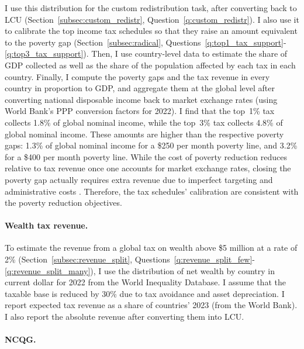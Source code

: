 I use this distribution for the custom redistribution task, after converting back to LCU (Section~\ref{subsec:custom_redistr}, Question~\ref{q:custom_redistr}). I also use it to calibrate the top income tax schedules so that they raise an amount equivalent to the poverty gap (Section~\ref{subsec:radical}, Questions~\ref{q:top1_tax_support}-\ref{q:top3_tax_support}). %
Then, I use country-level data to estimate the share of GDP collected as well as the share of the population affected by each tax in each country. 
Finally, I compute the poverty gaps and the tax revenue in every country in proportion to GDP, and aggregate them at the global level after converting national disposable income back to market exchange rates (using World Bank's PPP conversion factors for 2022). 
I find that the top~1\% tax collects 1.8\% of global nominal income, while the top~3\% tax collects 4.8\% of global nominal income. These amounts are higher than the respective poverty gaps: 1.3\% of global nominal income for a \$250 per month poverty line, and 3.2\% for a \$400 per month poverty line. 
While the cost of poverty reduction reduces relative to tax revenue once one accounts  for market exchange rates, closing the poverty gap actually requires extra revenue due to imperfect targeting and administrative costs \citep{sahoo_what_2025}. Therefore, the tax schedules' calibration are consistent with the poverty reduction objectives.

\paragraph{Wealth tax revenue.}

To estimate the revenue from a global tax on wealth above \$5 million at a rate of 2\% (Section~\ref{subsec:revenue_split}, Questions~\ref{q:revenue_split_few}-\ref{q:revenue_split_many}), I use the distribution of net wealth by country in current dollar for 2022 from the World Inequality Database. I assume that the taxable base is reduced by 30\% due to tax avoidance and asset depreciation. I report expected tax revenue as a share of countries' 2023 (from the World Bank). I also report the absolute revenue after converting them into LCU. 

\paragraph{NCQG.} 

